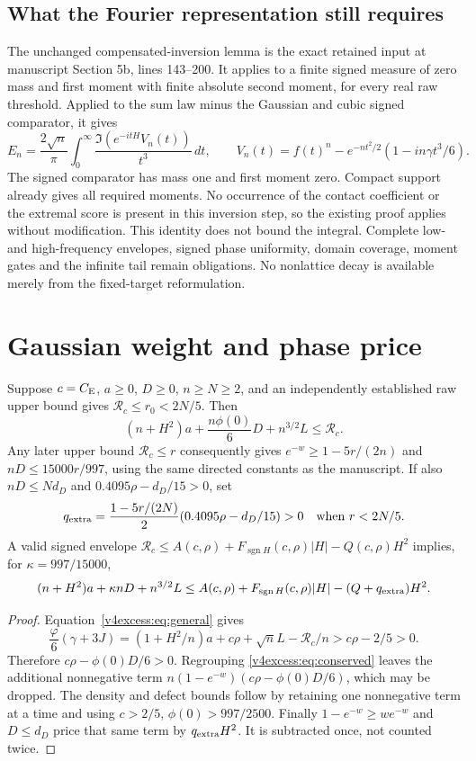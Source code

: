 \subsection{What the Fourier representation still requires}
The unchanged compensated-inversion lemma is the exact retained input
at manuscript Section 5b, lines 143--200. It applies to a finite signed
measure of zero mass and first moment with finite absolute second moment,
for every real raw threshold. Applied to the sum law minus the Gaussian
and cubic signed comparator, it gives
\[
 E_n=\frac{2\sqrt n}{\pi}\int_0^\infty
     \frac{\Im(e^{-itH}V_n(t))}{t^3}\,dt,
 \qquad V_n(t)=f(t)^n-e^{-nt^2/2}(1-in\gamma t^3/6).
\]
The signed comparator has mass one and first moment zero. Compact support
already gives all required moments. No occurrence of the contact
coefficient or the extremal score is present in this inversion step, so
the existing proof applies without modification.
This identity does not bound the integral. Complete low- and
high-frequency envelopes, signed phase uniformity, domain coverage,
moment gates and the infinite tail remain obligations. No nonlattice
decay is available merely from the fixed-target reformulation.

\section{Gaussian weight and phase price}
\begin{corollary}\label{v4excess:cor:weight}
Suppose $c=C_{\mathrm E}$, $a\ge0$, $D\ge0$, $n\ge N\ge2$, and an independently
established raw upper bound gives $\mathcal R_c\le r_0<2N/5$. Then
\[
 (n+H^2)a+\frac{n\phi(0)}6D+n^{3/2}L\le\mathcal R_c.
\]
Any later upper bound $\mathcal R_c\le r$ consequently gives
$e^{-w}\ge1-5r/(2n)$ and $nD\le15000r/997$, using the same directed
constants as the manuscript. If also $nD\le Nd_D$ and
$0.4095\rho-d_D/15>0$, set
\[
 q_{\rm extra}=\frac{1-5r/(2N)}2(0.4095\rho-d_D/15)>0
 \quad\text{when } r<2N/5.
\]
A valid signed envelope
$\mathcal R_c\le A(c,\rho)+F_{\operatorname{sgn}H}(c,\rho)|H|
-Q(c,\rho)H^2$ implies, for $\kappa=997/15000$,
\[
 (n+H^2)a+\kappa nD+n^{3/2}L
 \le A(c,\rho)+F_{\operatorname{sgn}H}(c,\rho)|H|
                       -(Q+q_{\rm extra})H^2.
\]
\end{corollary}
\begin{proof}
Equation~\eqref{v4excess:eq:general} gives
\[
 \frac{\varphi}{6}(\gamma+3J)
 =(1+H^2/n)a+c\rho+\sqrt nL-\mathcal R_c/n
 >c\rho-2/5>0.
\]
Therefore $c\rho-\phi(0)D/6>0$. Regrouping
\eqref{v4excess:eq:conserved} leaves the additional nonnegative term
$n(1-e^{-w})(c\rho-\phi(0)D/6)$, which may be dropped. The density and
defect bounds follow by retaining one nonnegative term at a time and
using $c>2/5$, $\phi(0)>997/2500$. Finally
$1-e^{-w}\ge we^{-w}$ and $D\le d_D$ price that same term by
$q_{\rm extra}H^2$. It is subtracted once, not counted twice.
\end{proof}

